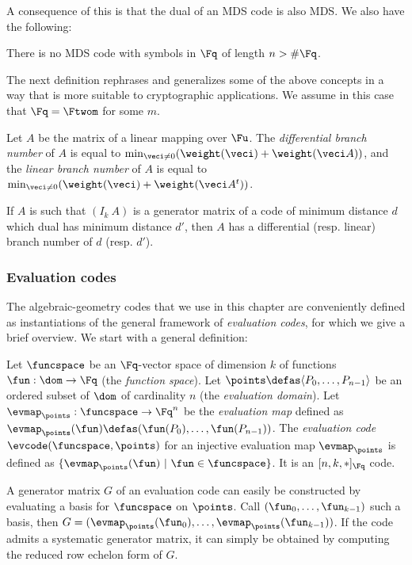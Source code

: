 A consequence of this is that the dual of an MDS code is also MDS.
We also have the following:

\begin{conj}
There is no MDS code with symbols in $\Fq$ of length $n > \#\Fq$.
\end{conj}

The next definition rephrases and generalizes some of the above concepts in a way that is more suitable to cryptographic applications.
We assume in this case that $\Fq = \Ftwom$ for some $m$.

\begin{defi}
Let $A$ be the matrix of a linear mapping over $\Fu$.
The \emph{differential branch number} of $A$
is equal to $\min_{\veci \neq 0}(\weight(\veci) + \weight(\veci A))$,
and the \emph{linear branch number} of $A$ is equal to $\min_{\veci \neq 0}(\weight(\veci) + \weight(\veci A^t))$.
\end{defi}

If $A$ is such that $(I_k~A)$ is a generator matrix of a code of minimum distance $d$ which dual has minimum distance $d'$,
then $A$ has a differential (resp. linear) branch number of $d$ (resp. $d'$).

\subsubsection{Evaluation codes}

The algebraic-geometry codes that we use in this chapter are conveniently defined as instantiations of the general framework of \emph{evaluation codes}, for which
we give a brief overview.
We start with a general definition:

\begin{defi}
Let $\funcspace$ be an $\Fq$-vector space of dimension $k$ of functions $\fun : \dom \rightarrow \Fq$ (the \emph{function space}). Let $\points \defas \langle P_0,\ldots, P_{n-1}\rangle$
be an ordered subset of $\dom$ of cardinality $n$ (the \emph{evaluation domain}). Let $\evmap_\points : \funcspace \rightarrow \Fq^n$ be the \emph{evaluation map}
defined as $\evmap_\points(\fun) \defas (\fun(P_0),\ldots,\fun(P_{n-1}))$.
The \emph{evaluation code} $\evcode(\funcspace,\points)$ for an injective evaluation map $\evmap_\points$ is defined as $\{\evmap_\points(\fun)~|~\fun \in \funcspace\}$.
It is an $[n,k,\ast]_{\Fq}$ code.
\end{defi}

A generator matrix $G$ of an evaluation code can easily be constructed by evaluating a basis for $\funcspace$ on $\points$. Call $(\fun_0,\ldots,\fun_{k-1})$
such a basis, then $G = (\evmap_\points(\fun_0),\ldots,\evmap_\points(\fun_{k-1}))$.
If the code admits a systematic generator matrix, it can simply be obtained by computing the reduced row echelon form of $G$.

